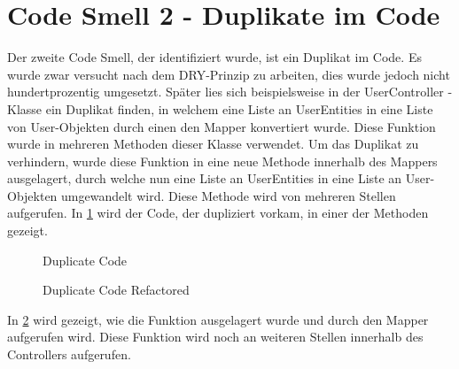 \section{Code Smell 2 - Duplikate im Code}
Der zweite Code Smell, der identifiziert wurde, ist ein Duplikat im Code. Es wurde zwar versucht nach dem DRY-Prinzip zu arbeiten, dies wurde jedoch nicht hundertprozentig umgesetzt. Später lies sich beispielsweise in der \glqq UserController \grqq -Klasse 
ein Duplikat finden, in welchem eine Liste an UserEntities in eine Liste von User-Objekten durch einen den Mapper konvertiert wurde. Diese Funktion wurde in mehreren Methoden dieser Klasse verwendet. 
\newline Um das Duplikat zu verhindern, wurde diese Funktion in eine neue Methode innerhalb des Mappers ausgelagert, durch welche nun eine Liste an UserEntities in eine Liste an User-Objekten umgewandelt wird. 
Diese Methode wird von mehreren Stellen aufgerufen. In \ref{codeSmell2Vorher} wird der Code, der dupliziert vorkam, in einer der Methoden gezeigt.
\begin{figure}[htbp]
    \centering
    \caption{\label{codeSmell2Vorher} Duplicate Code}
\end{figure}
\begin{figure}[htbp]
    \centering
    \caption{\label{codeSmell2Nachher} Duplicate Code Refactored}
\end{figure}
In \ref{codeSmell2Nachher} wird gezeigt, wie die Funktion ausgelagert wurde und durch den Mapper aufgerufen wird. Diese Funktion wird noch an weiteren Stellen innerhalb des Controllers aufgerufen.